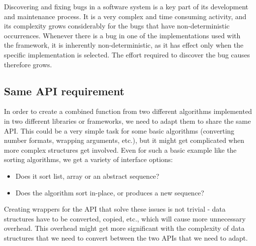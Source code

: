 Discovering and fixing bugs in a software system is a key part of its development and maintenance process. It is a very complex and time consuming activity, and its complexity grows considerably for the bugs that have non-deterministic occurrences. Whenever there is a bug in one of the implementations used with the framework, it is inherently non-deterministic, as it has effect only when the specific implementation is selected. The effort required to discover the bug causes therefore grows.

\subsection{Same API requirement}

In order to create a combined function from two different algorithms implemented in two different libraries or frameworks, we need to adapt them to share the same API. This could be a very simple task for some basic algorithms (converting number formats, wrapping arguments, etc.), but it might get complicated when more complex structures get involved. Even for such a basic example like the sorting algorithms, we get a variety of interface options:

\begin{itemize}
	\item Does it sort list, array or an abstract sequence?
	\item Does the algorithm sort in-place, or produces a new sequence?
\end{itemize}

Creating wrappers for the API that solve these issues is not trivial - data structures have to be converted, copied, etc., which will cause more unnecessary overhead. This overhead might get more significant with the complexity of data structures that we need to convert between the two APIs that we need to adapt.